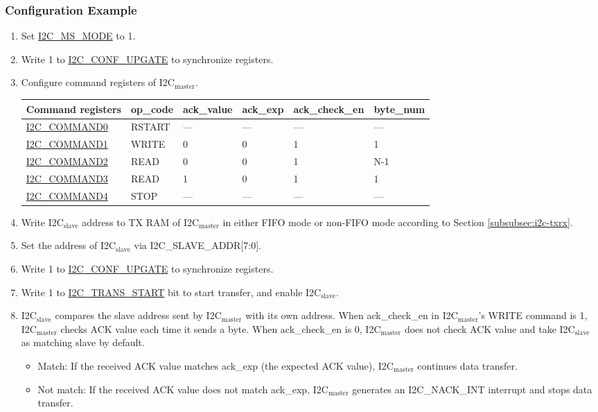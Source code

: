 \documentclass[main\_\_EN.tex]{subfiles}
\begin{document}
\subsubsection{Configuration Example}
\begin{enumerate}
\item Set \hyperref[fielddesc:I2CMSMODE]{I2C\_MS\_MODE} to 1.
\item Write 1 to \hyperref[fielddesc:I2CCONFUPGATE]{I2C\_CONF\_UPGATE} to synchronize registers.
\item Configure command registers of I2C$_\text{master}$.
\begin{longtable}{ | p{4cm} | p{2cm} | p{2cm} | p{2cm} |p{2cm} | p{2cm} |}
\hline\rowcolor{lightgray}
Command registers & op\_code & ack\_value&ack\_exp&ack\_check\_en&byte\_num  \\ \hline
\hyperref[fielddesc:I2CCOMMAND0]{I2C\_COMMAND0} & RSTART& ---&---&---&---  \\ \hline
\hyperref[fielddesc:I2CCOMMAND1]{I2C\_COMMAND1} & WRITE& 0&0&1&1  \\ \hline
\hyperref[fielddesc:I2CCOMMAND2]{I2C\_COMMAND2} & READ& 0&0&1&N-1  \\ \hline
\hyperref[fielddesc:I2CCOMMAND3]{I2C\_COMMAND3} & READ& 1&0&1&1  \\ \hline
\hyperref[fielddesc:I2CCOMMAND4]{I2C\_COMMAND4} & STOP& ---&---&---&---  \\ \hline
\end{longtable}
\item Write I2C$_\text{slave}$ address to TX RAM of I2C$_\text{master}$ in either FIFO mode or non-FIFO mode according to Section \ref{subsubsec:i2c-txrx}.
\item Set the address of I2C$_\text{slave}$ via I2C\_SLAVE\_ADDR[7:0].
\item Write 1 to \hyperref[fielddesc:I2CCONFUPGATE]{I2C\_CONF\_UPGATE} to synchronize registers.
\item Write 1 to \hyperref[fielddesc:I2CTRANSSTART]{I2C\_TRANS\_START} bit to start transfer, and enable I2C$_\text{slave}$.

\item I2C$_\text{slave}$ compares the slave address sent by I2C$_\text{master}$ with its own address. When ack\_check\_en in I2C$_\text{master}$'s WRITE command is 1, I2C$_\text{master}$ checks ACK value each time it sends a byte. When ack\_check\_en is 0, I2C$_\text{master}$ does not check ACK value and take I2C$_\text{slave}$ as matching slave by default.
\begin{itemize}
\item Match: If the received ACK value matches ack\_exp (the expected ACK value), I2C$_\text{master}$ continues data transfer.
\item Not match: If the received ACK value does not match ack\_exp, I2C$_\text{master}$ generates an I2C\_NACK\_INT interrupt and stops data transfer.
\end{itemize}


\end{enumerate}
\end{document}
